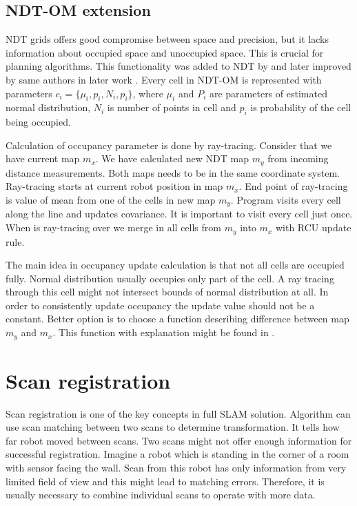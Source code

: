 \subsection{NDT-OM extension}
NDT grids offers good compromise between space and precision, but it lacks information about occupied space and unoccupied space. This is crucial for planning algorithms. This functionality was added to NDT by \cite{Saarinen13} and later improved by same authors in later work \cite{Saarinen213}. Every cell in NDT-OM is represented with parameters $c_{i}=\{\mu_{i}, p_{i}, N_{i},p_{i}\}$, where $\mu_{i}$ and $P_{i}$ are parameters of estimated normal distribution, $N_{i}$ is number of points in cell and $p_{i}$ is probability of the cell being occupied. 

Calculation of occupancy parameter is done by ray-tracing. Consider that we have current map $m_{x}$. We have calculated new NDT map $m_{y}$ from incoming distance measurements. Both maps needs to be in the same coordinate system. Ray-tracing starts at current robot position in map $m_{x}$. End point of ray-tracing is value of mean from one of the cells in new map $m_{y}$. Program visits every cell along the line and updates covariance. It is important to visit every cell just once. When is ray-tracing over we merge in all cells from $m_{y}$ into $m_{x}$ with RCU update rule.

The main idea in occupancy update calculation is that not all cells are occupied fully. Normal distribution usually occupies only part of the cell. A ray tracing through this cell might not intersect bounds of normal distribution at all. In order to consistently update occupancy the update value should not be a constant. Better option is to choose a function describing difference between map $m_{y}$ and $m_{x}$. This function with explanation might be found in \cite{Saarinen213}.



\newpage   
\section{Scan registration}
\label{Scan_reg}
Scan registration is one of the key concepts in full SLAM solution. Algorithm can use scan matching between two scans to determine transformation. It tells how far robot moved between scans. Two scans might not offer enough information for successful registration. Imagine a robot which is standing in the corner of a room with sensor facing the wall. Scan from this robot has only information from very limited field of view and this might lead to matching errors. Therefore, it is usually necessary to combine individual scans to operate with more data.  

